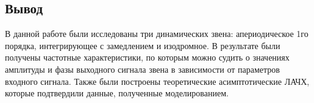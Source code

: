 \documentclass[a4paper,12pt]{article}
\begin{document}
	\clearpage
	\begin{center}
	\section*{Вывод}
	\end{center}
	
	В данной работе были исследованы три динамических звена: апериодическое 1го порядка, интегрирующее с замедлением и изодромное. В результате были получены частотные характеристики, по которым можно судить о значениях амплитуды и фазы выходного сигнала звена в зависимости от параметров входного сигнала. Также были построены теоретические асимптотические ЛАЧХ, которые подтвердили данные, полученные моделированием.
\end{document}
